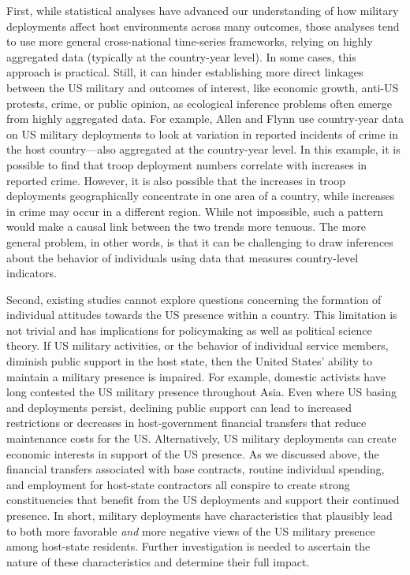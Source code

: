 First, while statistical analyses have advanced our understanding of how military deployments affect host environments across many outcomes, those analyses tend to use more general cross-national time-series frameworks, relying on highly aggregated data (typically at the country-year level). In some cases, this approach is practical. Still, it can hinder establishing more direct linkages between the US military and outcomes of interest, like economic growth, anti-US protests, crime, or public opinion, as ecological inference problems often emerge from highly aggregated data. For example, Allen and Flynn use country-year data on US military deployments to look at variation in reported incidents of crime in the host country---also aggregated at the country-year level.\autocite{allenandflynn2013} In this example, it is possible to find that troop deployment numbers correlate with increases in reported crime. However, it is also possible that the increases in troop deployments geographically concentrate in one area of a country, while increases in crime may occur in a different region. While not impossible, such a pattern would make a causal link between the two trends more tenuous. The more general problem, in other words, is that it can be challenging to draw inferences about the behavior of individuals using data that measures country-level indicators. 

Second, existing studies cannot explore questions concerning the formation of individual attitudes towards the US presence within a country. This limitation is not trivial and has implications for policymaking as well as political science theory. If US military activities, or the behavior of individual service members, diminish public support in the host state, then the United States' ability to maintain a military presence is impaired. For example, domestic activists have long contested the US military presence throughout Asia.\autocite{Chanlett-Avery2012} Even where US basing and deployments persist, declining public support can lead to increased restrictions or decreases in host-government financial transfers that reduce maintenance costs for the US. Alternatively, US military deployments can create economic interests in support of the US presence.\autocite{Holmes2014} As we discussed above, the financial transfers associated with base contracts, routine individual spending, and employment for host-state contractors all conspire to create strong constituencies that benefit from the US deployments and support their continued presence. In short, military deployments have characteristics that plausibly lead to both more favorable \textit{and} more negative views of the US military presence among host-state residents. Further investigation is needed to ascertain the nature of these characteristics and determine their full impact.

